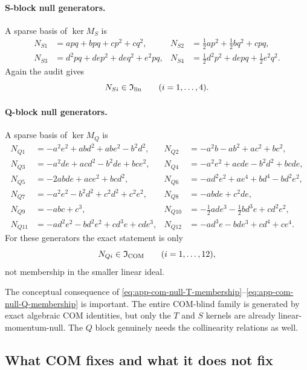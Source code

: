 \documentclass[11pt]{article}
\begin{document}
\paragraph{S-block null generators.}
A sparse basis of $\ker M_S$ is
{\small
\begin{align*}
N_{S1}&=apq+bpq+cp^2+cq^2,
&
N_{S2}&=\frac12 a p^2+\frac12 b q^2+cpq,
\\
N_{S3}&=d^2pq+dep^2+deq^2+e^2pq,
&
N_{S4}&=\frac12 d^2p^2+depq+\frac12 e^2q^2.
\end{align*}}
Again the audit gives
\begin{equation}
N_{Si}\in\mathfrak I_{\rm lin}
\qquad (i=1,\dots,4).
\label{eq:app-com-null-S-membership}
\end{equation}

\paragraph{Q-block null generators.}
A sparse basis of $\ker M_Q$ is
{\small
\begin{align*}
N_{Q1}&=-a^2e^2+ab d^2+ab e^2-b^2d^2,
&
N_{Q2}&=-a^2b-ab^2+ac^2+bc^2,
\\
N_{Q3}&=-a^2de+ac d^2-b^2de+bc e^2,
&
N_{Q4}&=-a^2e^2+acde-b^2d^2+bcde,
\\
N_{Q5}&=-2abde+ac e^2+bc d^2,
&
N_{Q6}&=-ad^2e^2+ae^4+bd^4-bd^2e^2,
\\
N_{Q7}&=-a^2e^2-b^2d^2+c^2d^2+c^2e^2,
&
N_{Q8}&=-abde+c^2de,
\\
N_{Q9}&=-abc+c^3,
&
N_{Q10}&=-\frac12 ad e^3-\frac12 bd^3e+cd^2e^2,
\\
N_{Q11}&=-ad^2e^2-bd^2e^2+cd^3e+cde^3,
&
N_{Q12}&=-ad^3e-bde^3+cd^4+ce^4.
\end{align*}}
For these generators the exact statement is only
\begin{equation}
N_{Qi}\in\mathfrak I_{\rm COM}
\qquad (i=1,\dots,12),
\label{eq:app-com-null-Q-membership}
\end{equation}
not membership in the smaller linear ideal.

The conceptual consequence of
\eqref{eq:app-com-null-T-membership}--\eqref{eq:app-com-null-Q-membership} is
important.  The entire COM-blind family is generated by exact algebraic COM
identities, but only the $T$ and $S$ kernels are already linear-momentum-null.
The $Q$ block genuinely needs the collinearity relations as well.

\subsection{What COM fixes and what it does not fix}
\label{app:com-null-fixes}
\end{document}

